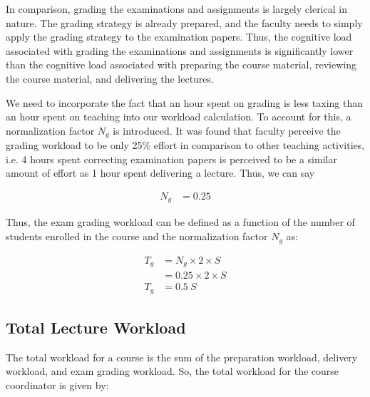 In comparison, grading the examinations and assignments is largely clerical in nature. The grading strategy is already prepared, and the faculty needs to simply apply the grading strategy to the examination papers. Thus, the cognitive load associated with grading the examinations and assignments is significantly lower than the cognitive load associated with preparing the course material, reviewing the course material, and delivering the lectures.

We need to incorporate the fact that an hour spent on grading is less taxing than an hour spent on teaching into our workload calculation. To account for this, a normalization factor \(N_g\) is introduced. It was found that faculty perceive the grading workload to be only 25\% effort in comparison to other teaching activities, i.e. 4 hours spent correcting examination papers is perceived to be a similar amount of effort as 1 hour spent delivering a lecture. Thus, we can say

\begin{equation*}
  \begin{aligned}
    N_g & = 0.25
  \end{aligned}
\end{equation*}


Thus, the exam grading workload can be defined as a function of the number of students enrolled in the course and the normalization factor \(N_g\) as:


\begin{equation}
  \label{eqn:exam-grading-workload}
  \begin{aligned}
    T_g & = N_g \times 2 \times S  \\
        & = 0.25 \times 2 \times S \\
    T_g & = 0.5\ S
  \end{aligned}
\end{equation}

\subsection{Total Lecture Workload}

The total workload for a course is the sum of the preparation workload, delivery workload, and exam grading workload. So, the total workload for the course coordinator is given by:

